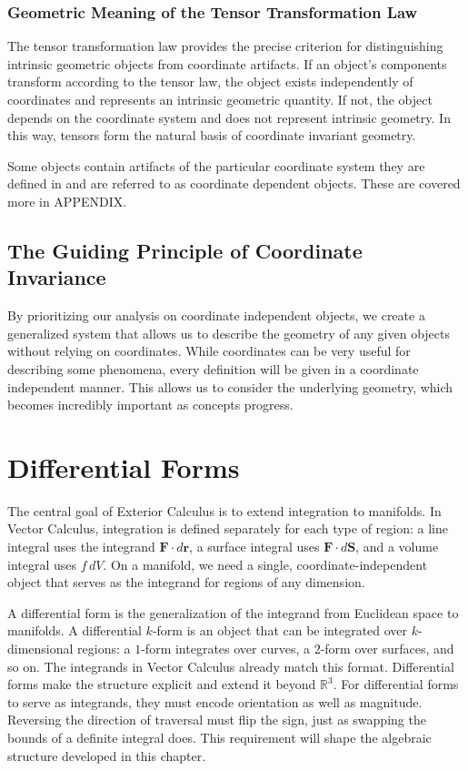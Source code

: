 \documentclass[12pt]{article}
\newcommand{\R}{\mathbb{R}}
\newcommand{\bv}[1]{\mathbf{#1}}
\begin{document}
\subsubsection{Geometric Meaning of the Tensor Transformation Law}

The tensor transformation law provides the precise criterion for distinguishing intrinsic geometric objects from coordinate artifacts. If an object's components transform according to the tensor law, the object exists independently of coordinates and represents an intrinsic geometric quantity. If not, the object depends on the coordinate system and does not represent intrinsic geometry. In this way, tensors form the natural basis of coordinate invariant geometry.

Some objects contain artifacts of the particular coordinate system they are defined in and are referred to as coordinate dependent objects. These are covered more in APPENDIX.

\subsection{The Guiding Principle of Coordinate Invariance}

By prioritizing our analysis on coordinate independent objects, we create a generalized system that allows us to describe the geometry of any given objects without relying on coordinates. While coordinates can be very useful for describing some phenomena, every definition will be given in a coordinate independent manner. This allows us to consider the underlying geometry, which becomes incredibly important as concepts progress. 

\section{Differential Forms}

The central goal of Exterior Calculus is to extend integration to manifolds. In Vector Calculus, integration is defined separately for each type of region: a line integral uses the integrand $\bv{F} \cdot d\bv{r}$, a surface integral uses $\bv{F} \cdot d\bv{S}$, and a volume integral uses $f\,dV$. On a manifold, we need a single, coordinate-independent object that serves as the integrand for regions of any dimension.

A differential form is the generalization of the integrand from Euclidean space to manifolds. A differential $k$-form is an object that can be integrated over $k$-dimensional regions: a $1$-form integrates over curves, a $2$-form over surfaces, and so on. The integrands in Vector Calculus already match this format. Differential forms make the structure explicit and extend it beyond $\R^3$. For differential forms to serve as integrands, they must encode orientation as well as magnitude. Reversing the direction of traversal must flip the sign, just as swapping the bounds of a definite integral does. This requirement will shape the algebraic structure developed in this chapter.
\end{document}

